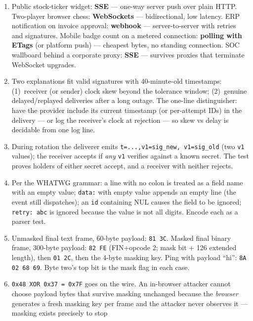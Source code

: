 \begin{enumerate}[label=\textbf{E11.\arabic*.}, leftmargin=2.8em]
  \item Public stock-ticker widget: \textbf{SSE} --- one-way server push
    over plain HTTP. Two-player browser chess: \textbf{WebSockets} ---
    bidirectional, low latency. ERP notification on invoice approval:
    \textbf{webhook} --- server-to-server with retries and signatures.
    Mobile badge count on a metered connection: \textbf{polling with ETags}
    (or platform push) --- cheapest bytes, no standing connection. SOC
    wallboard behind a corporate proxy: \textbf{SSE} --- survives proxies
    that terminate WebSocket upgrades.
  \item Two explanations fit valid signatures with 40-minute-old timestamps:
    (1)~receiver (or sender) clock skew beyond the tolerance window;
    (2)~genuine delayed/replayed deliveries after a long outage. The
    one-line distinguisher: have the provider include its current timestamp
    (or per-attempt IDs) in the delivery --- or log the receiver's clock at
    rejection --- so skew vs delay is decidable from one log line.
  \item During rotation the deliverer emits \texttt{t=...,v1=sig\_new,
    v1=sig\_old} (two \texttt{v1} values); the receiver accepts if
    \emph{any} \texttt{v1} verifies against a known secret. The test proves
    holders of either secret accept, and a receiver with neither rejects.
  \item Per the WHATWG grammar: a line with no colon is treated as a field
    name with an empty value; \texttt{data:} with empty value appends an
    empty line (the event still dispatches); an \texttt{id} containing NUL
    causes the field to be ignored; \texttt{retry: abc} is ignored because
    the value is not all digits. Encode each as a parser test.
  \item Unmasked final text frame, 60-byte payload: \texttt{81 3C}. Masked
    final binary frame, 300-byte payload: \texttt{82 FE} (FIN+opcode 2;
    mask bit + 126 extended length), then \texttt{01 2C}, then the 4-byte
    masking key. Ping with payload ``hi'': \texttt{8A 02 68 69}. Byte two's
    top bit is the mask flag in each case.
  \item \texttt{0x48 XOR 0x37 = 0x7F} goes on the wire. An in-browser
    attacker cannot choose payload bytes that survive masking unchanged
    because the \emph{browser} generates a fresh masking key per frame and
    the attacker never observes it --- masking exists precisely to stop

\end{enumerate}
